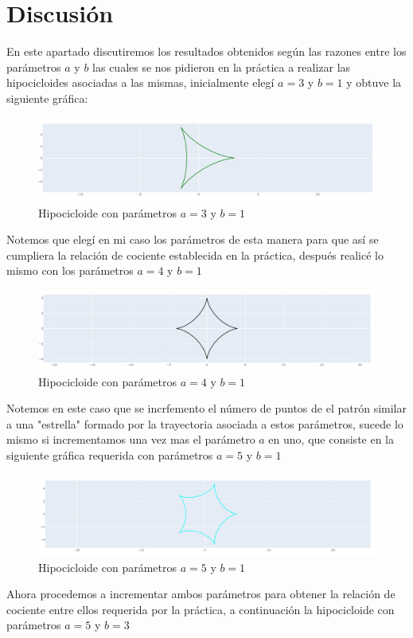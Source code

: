\documentclass[letterpaper,11pt,dvipsnames]{article}
\begin{document}
\section{Discusión}
En este apartado discutiremos los resultados obtenidos según las razones entre los parámetros $a$ y $b$ las cuales se nos pidieron en la práctica a realizar las hipocicloides asociadas a las mismas, inicialmente elegí $a = 3$ y $b=1$ y obtuve la siguiente gráfica:
\begin{figure}[H]
    \centering
    \includegraphics[scale=0.4]{grafica1.jpg}
    \caption{Hipocicloide con parámetros $a = 3$ y $b=1$ }
    \label{fig:sample}
\end{figure}
Notemos que elegí en mi caso los parámetros de esta manera para que así se cumpliera la relación de cociente establecida en la práctica, después realicé lo mismo con los parámetros $a = 4$ y $b=1$
\begin{figure}[H]
    \centering
    \includegraphics[scale=0.4]{grafica2.jpg}
    \caption{Hipocicloide con parámetros $a = 4$ y $b=1$ }
    \label{fig:sample}
\end{figure}
Notemos en este caso que se incrfemento el número de puntos de el patrón similar a una "estrella" formado por la trayectoria asociada a estos parámetros, sucede lo mismo si incrementamos una vez mas el parámetro $a$ en uno, que consiste en la siguiente gráfica requerida con parámetros $a = 5$ y $b=1$
\begin{figure}[H]
    \centering
    \includegraphics[scale=0.4]{grafica3.jpg}
    \caption{Hipocicloide con parámetros $a = 5$ y $b=1$ }
    \label{fig:sample}
\end{figure}
\newpage
Ahora procedemos a incrementar ambos parámetros para obtener la relación de cociente entre ellos requerida por la práctica, a continuación la hipocicloide con parámetros $a = 5$ y $b=3$ 
\end{document}
